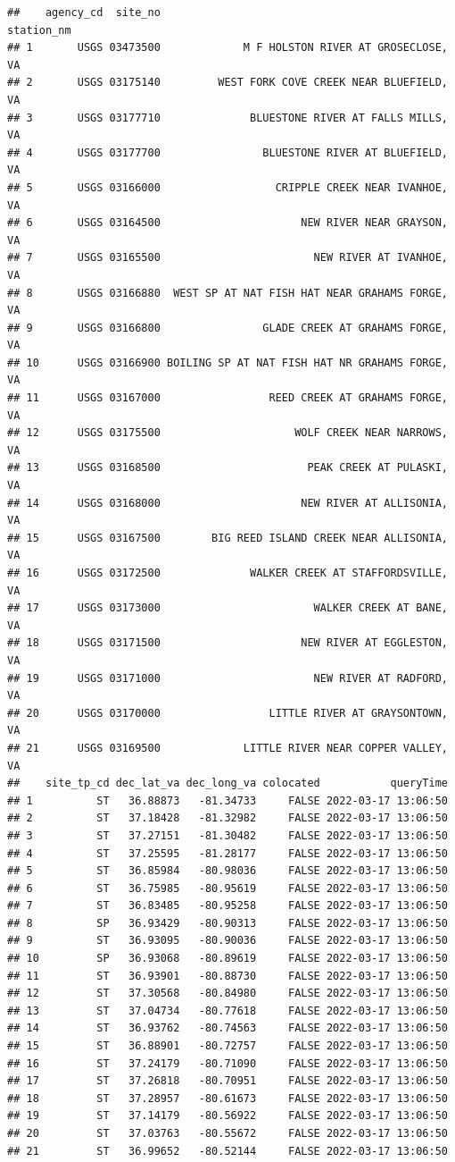 \documentclass[
]{book}
\begin{document}
\begin{verbatim}
##    agency_cd  site_no                                      station_nm
## 1       USGS 03473500             M F HOLSTON RIVER AT GROSECLOSE, VA
## 2       USGS 03175140         WEST FORK COVE CREEK NEAR BLUEFIELD, VA
## 3       USGS 03177710              BLUESTONE RIVER AT FALLS MILLS, VA
## 4       USGS 03177700                BLUESTONE RIVER AT BLUEFIELD, VA
## 5       USGS 03166000                  CRIPPLE CREEK NEAR IVANHOE, VA
## 6       USGS 03164500                      NEW RIVER NEAR GRAYSON, VA
## 7       USGS 03165500                        NEW RIVER AT IVANHOE, VA
## 8       USGS 03166880  WEST SP AT NAT FISH HAT NEAR GRAHAMS FORGE, VA
## 9       USGS 03166800                GLADE CREEK AT GRAHAMS FORGE, VA
## 10      USGS 03166900 BOILING SP AT NAT FISH HAT NR GRAHAMS FORGE, VA
## 11      USGS 03167000                 REED CREEK AT GRAHAMS FORGE, VA
## 12      USGS 03175500                     WOLF CREEK NEAR NARROWS, VA
## 13      USGS 03168500                       PEAK CREEK AT PULASKI, VA
## 14      USGS 03168000                      NEW RIVER AT ALLISONIA, VA
## 15      USGS 03167500        BIG REED ISLAND CREEK NEAR ALLISONIA, VA
## 16      USGS 03172500              WALKER CREEK AT STAFFORDSVILLE, VA
## 17      USGS 03173000                        WALKER CREEK AT BANE, VA
## 18      USGS 03171500                      NEW RIVER AT EGGLESTON, VA
## 19      USGS 03171000                        NEW RIVER AT RADFORD, VA
## 20      USGS 03170000                 LITTLE RIVER AT GRAYSONTOWN, VA
## 21      USGS 03169500             LITTLE RIVER NEAR COPPER VALLEY, VA
##    site_tp_cd dec_lat_va dec_long_va colocated           queryTime
## 1          ST   36.88873   -81.34733     FALSE 2022-03-17 13:06:50
## 2          ST   37.18428   -81.32982     FALSE 2022-03-17 13:06:50
## 3          ST   37.27151   -81.30482     FALSE 2022-03-17 13:06:50
## 4          ST   37.25595   -81.28177     FALSE 2022-03-17 13:06:50
## 5          ST   36.85984   -80.98036     FALSE 2022-03-17 13:06:50
## 6          ST   36.75985   -80.95619     FALSE 2022-03-17 13:06:50
## 7          ST   36.83485   -80.95258     FALSE 2022-03-17 13:06:50
## 8          SP   36.93429   -80.90313     FALSE 2022-03-17 13:06:50
## 9          ST   36.93095   -80.90036     FALSE 2022-03-17 13:06:50
## 10         SP   36.93068   -80.89619     FALSE 2022-03-17 13:06:50
## 11         ST   36.93901   -80.88730     FALSE 2022-03-17 13:06:50
## 12         ST   37.30568   -80.84980     FALSE 2022-03-17 13:06:50
## 13         ST   37.04734   -80.77618     FALSE 2022-03-17 13:06:50
## 14         ST   36.93762   -80.74563     FALSE 2022-03-17 13:06:50
## 15         ST   36.88901   -80.72757     FALSE 2022-03-17 13:06:50
## 16         ST   37.24179   -80.71090     FALSE 2022-03-17 13:06:50
## 17         ST   37.26818   -80.70951     FALSE 2022-03-17 13:06:50
## 18         ST   37.28957   -80.61673     FALSE 2022-03-17 13:06:50
## 19         ST   37.14179   -80.56922     FALSE 2022-03-17 13:06:50
## 20         ST   37.03763   -80.55672     FALSE 2022-03-17 13:06:50
## 21         ST   36.99652   -80.52144     FALSE 2022-03-17 13:06:50
\end{verbatim}
\end{document}
